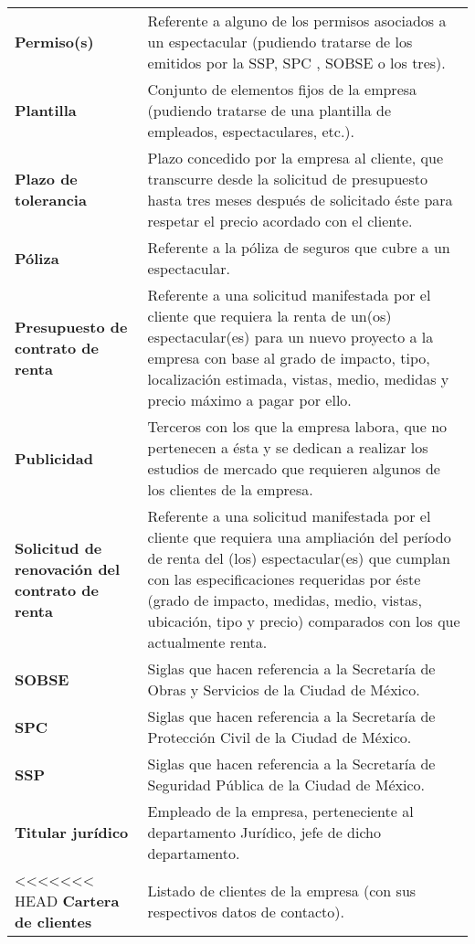 \begin{longtable}[H]{m{4cm}m{8cm}}
\textbf{Permiso(s)} & Referente a alguno de los permisos asociados a un espectacular (pudiendo tratarse de los emitidos por la SSP, SPC , SOBSE o los tres). \tabularnewline

\textbf{Plantilla} & Conjunto de elementos fijos de la empresa (pudiendo tratarse de una plantilla de empleados, espectaculares, etc.). \tabularnewline

\textbf{Plazo de tolerancia} & Plazo concedido por la empresa al cliente, que transcurre desde la solicitud de presupuesto hasta tres meses después de solicitado éste para respetar el precio acordado con el cliente.\tabularnewline

\textbf{Póliza} & Referente a la póliza de seguros que cubre a un espectacular. \tabularnewline

\textbf{Presupuesto de contrato de renta} & Referente a una solicitud manifestada por el cliente que requiera la renta de un(os) espectacular(es) para un nuevo proyecto a la empresa con base al grado de impacto, tipo, localización estimada, vistas, medio, medidas y precio máximo a pagar por ello.\tabularnewline

\textbf{Publicidad} & Terceros con los que la empresa labora, que no pertenecen a ésta y se dedican a realizar los estudios de mercado que requieren algunos de los clientes de la empresa.\tabularnewline

\textbf{Solicitud de renovación del contrato de renta} & Referente a una solicitud manifestada por el cliente que requiera una ampliación del período de renta del (los) espectacular(es) que cumplan con las especificaciones requeridas por éste (grado de impacto, medidas, medio, vistas, ubicación, tipo y precio) comparados con los que actualmente renta.\tabularnewline

\textbf{SOBSE} & Siglas que hacen referencia a la Secretaría de Obras y Servicios de la Ciudad de México. \tabularnewline

\textbf{SPC} & Siglas que hacen referencia a la Secretaría de Protección Civil de la Ciudad de México. \tabularnewline

\textbf{SSP} & Siglas que hacen referencia a la Secretaría de Seguridad Pública de la Ciudad de México. \tabularnewline

\textbf{Titular jurídico} & Empleado de la empresa, perteneciente al departamento Jurídico, jefe de dicho departamento. \tabularnewline

<<<<<<< HEAD
\textbf{Cartera de clientes} & Listado de clientes de la empresa (con sus respectivos datos de contacto). \tabularnewline


\end{longtable}
